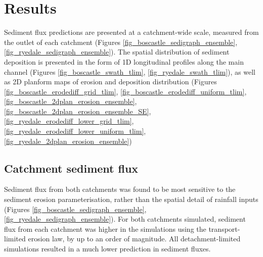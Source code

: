 %
%

\section{Results}

Sediment flux predictions are presented at a catchment-wide scale, measured from the outlet of each catchment (Figures \ref{fig_boscastle_sedigraph_ensemble}, \ref{fig_ryedale_sedigraph_ensemble}). The spatial distribution of sediment deposition is presented in the form of 1D longitudinal profiles along the main channel (Figures \ref{fig_boscastle_swath_tlim}, \ref{fig_ryedale_swath_tlim}), as well as 2D planform maps of erosion and deposition distribution (Figures \ref{fig_boscastle_erodediff_grid_tlim}, \ref{fig_boscastle_erodediff_uniform_tlim}, \ref{fig_boscastle_2dplan_erosion_ensemble}, \ref{fig_boscastle_2dplan_erosion_ensemble_SE}, \ref{fig_ryedale_erodediff_lower_grid_tlim}, \ref{fig_ryedale_erodediff_lower_uniform_tlim}, \ref{fig_ryedale_2dplan_erosion_ensemble})

\subsection{Catchment sediment flux}
Sediment flux from both catchments was found to be most sensitive to the sediment erosion parameterisation, rather than the spatial detail of rainfall inputs (Figures \ref{fig_boscastle_sedigraph_ensemble}, \ref{fig_ryedale_sedigraph_ensemble}). For both catchments simulated, sediment flux from each catchment was higher in the simulations using the transport-limited erosion law, by up to an order of magnitude. All detachment-limited simulations resulted in a much lower prediction in sediment fluxes.

